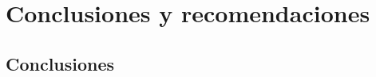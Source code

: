 \chapter{Conclusiones y recomendaciones}\label{sec:Conclusiones_recomendaciones}
\thispagestyle{empty}

\begingroup
{}
\small

\endgroup

\section{Conclusiones}
